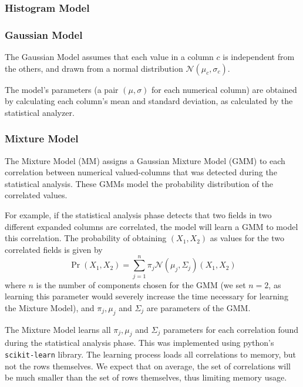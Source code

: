 
\subsubsection{Histogram Model}
\subsubsection{Gaussian Model}
\label{sec:gaus_model}
The Gaussian Model assumes that each value in a column $c$ is  independent from the others, and drawn from a normal distribution $\mathcal N(\mu_c, \sigma_c)$.

The model's parameters (a pair $(\mu, \sigma)$ for each numerical column) are obtained by calculating each column's mean and standard deviation, as calculated by the statistical analyzer. %

\subsubsection{Mixture Model}

The Mixture Model (MM) assigns a Gaussian Mixture Model (GMM) to each correlation between numerical valued-columns that was detected during the statistical analysis. These GMMs model the probability distribution of the correlated values.

For example, if the statistical analysis phase detects that two fields in two different expanded columns are correlated, the model will learn a GMM to model this correlation. The probability of obtaining $(X_1, X_2)$ as values for the two correlated fields is given by
\[\Pr(X_1, X_2) = \sum_{j=1}^{n} \pi_j \mathcal N(\mu_j, \Sigma_j)(X_1, X_2)\]
where $n$ is the number of components chosen for the GMM (we set $n=2$, as learning this parameter would severely increase the time necessary for learning the Mixture Model), and $\pi_j, \mu_j$ and $\Sigma_j$ are parameters of the GMM. 

The Mixture Model learns all  $\pi_j, \mu_j$ and $\Sigma_j$ parameters for each correlation found during the statistical analysis phase. This was implemented using python's \texttt{scikit-learn} library. The learning process loads all correlations to memory, but not the rows themselves. We expect that on average, the set of correlations will be much smaller than the set of rows themselves, thus limiting memory usage.

